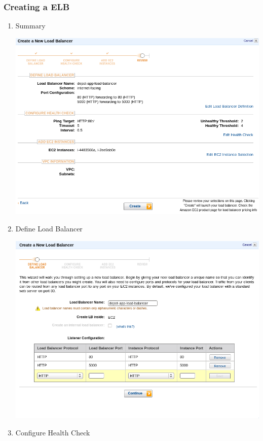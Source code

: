 \documentclass{beamer}
\begin{document}
\begin{frame}
\frametitle{Creating a ELB}
\begin{enumerate}	
\item Summary
\begin{center}
\includegraphics[scale=0.3]{createaelb2.png}
\end{center}
\item Define Load Balancer
\begin{center}
\includegraphics[scale=0.3]{readytocreate.png}
\end{center}	
\item Configure Health Check
\begin{center}

\end{center}
\end{enumerate}
\end{frame}
\end{document}
